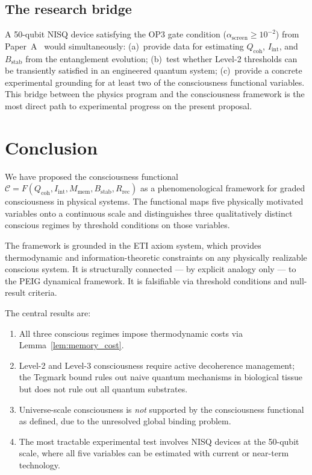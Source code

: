 \documentclass[12pt,letterpaper]{article}
\newcommand{\Cfunc}{\mathcal{C}}
\newcommand{\Qcoh}{Q_{\mathrm{coh}}}
\newcommand{\Iint}{I_{\mathrm{int}}}
\newcommand{\Mmem}{M_{\mathrm{mem}}}
\newcommand{\Bstab}{B_{\mathrm{stab}}}
\newcommand{\Rrec}{R_{\mathrm{rec}}}
\newcommand{\ascreen}{\alpha_{\mathrm{screen}}}
\begin{document}
\subsection{The research bridge}

A 50-qubit NISQ device satisfying the OP3 gate condition
($\ascreen \geq 10^{-2}$) from Paper~A~\cite{Monette2026a} would
simultaneously: (a)~provide data for estimating $\Qcoh$, $\Iint$, and
$\Bstab$ from the entanglement evolution; (b)~test whether Level-2
thresholds can be transiently satisfied in an engineered quantum system;
(c)~provide a concrete experimental grounding for at least two of the
consciousness functional variables. This bridge between the physics
program and the consciousness framework is the most direct path to
experimental progress on the present proposal.

\section{Conclusion}
\label{sec:conclusion}

We have proposed the consciousness functional $\Cfunc = F(\Qcoh, \Iint, \Mmem, \Bstab, \Rrec)$
as a phenomenological framework for graded consciousness in physical systems.
The functional maps five physically motivated variables onto a continuous
scale and distinguishes three qualitatively distinct conscious regimes by
threshold conditions on those variables.

The framework is grounded in the ETI axiom system, which provides
thermodynamic and information-theoretic constraints on any physically
realizable conscious system. It is structurally connected --- by explicit
analogy only --- to the PEIG dynamical framework. It is falsifiable via
threshold conditions and null-result criteria.

The central results are:
\begin{enumerate}[label=(\roman*)]
  \item All three conscious regimes impose thermodynamic costs via Lemma~\ref{lem:memory_cost}.
  \item Level-2 and Level-3 consciousness require active decoherence management;
    the Tegmark bound rules out naive quantum mechanisms in biological tissue
    but does not rule out all quantum substrates.
  \item Universe-scale consciousness is \emph{not} supported by the
    consciousness functional as defined, due to the unresolved global binding problem.
  \item The most tractable experimental test involves NISQ devices at the 50-qubit scale,
    where all five variables can be estimated with current or near-term technology.
\end{enumerate}
\end{document}
